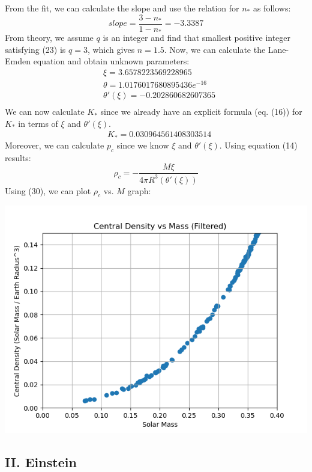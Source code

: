 \documentclass{article}
\begin{document}
From the fit, we can calculate the slope and use the relation for $n_*$ as follows:
\begin{equation}
    slope = \frac{3-n_*}{1-n_*} = -3.3387
\end{equation}
From theory, we assume $q$ is an integer and find that smallest positive integer satisfying (23) is $q=3$, which gives $n=1.5$. Now, we can calculate the Lane-Emden equation and obtain unknown parameters:
\begin{align}
    &\xi  = 3.6578223569228965 \\
    &\theta	=	1.0176017680895436e^{-16} \\
    &\theta '(\xi)	=	-0.202860682607365 \\
\end{align}
We can now calculate $K_*$ since we already have an explicit formula (eq. (16)) for $K_*$ in terms of $\xi$ and $\theta ' (\xi)$.
\begin{align}
    &K_* = 0.030964561408303514
\end{align}
Moreover, we can calculate $p_c$ since we know $\xi$ and $\theta'(\xi)$. Using equation (14) results:
\begin{equation}
    \rho_c = -\frac{M\xi}{4\pi R^3(\theta '(\xi))}
\end{equation}
\newpage
Using (30), we can plot $\rho_c$ vs. $M$ graph:
\begin{center}
    \includegraphics[scale=0.65]{images_newton/3_rhoc_vs_M.png}
\end{center}
\begin{center}
  \section*{II. Einstein}  
\end{center}
\end{document}
